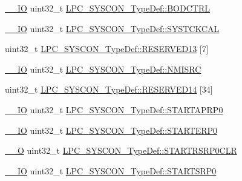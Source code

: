 \begin{DoxyCompactItemize}
\item 
\hyperlink{group___c_m_s_i_s__core__definitions_gaec43007d9998a0a0e01faede4133d6be}{\+\_\+\+\_\+\+IO} uint32\+\_\+t \hyperlink{group___l_p_c11xx___definitions_ga6c18e909c190b4b0819a72c6cc346661}{L\+P\+C\+\_\+\+S\+Y\+S\+C\+O\+N\+\_\+\+Type\+Def\+::\+B\+O\+D\+C\+T\+RL}
\item 
\hyperlink{group___c_m_s_i_s__core__definitions_gaec43007d9998a0a0e01faede4133d6be}{\+\_\+\+\_\+\+IO} uint32\+\_\+t \hyperlink{group___l_p_c11xx___definitions_gaa7900975ba840724314c3994379eb63b}{L\+P\+C\+\_\+\+S\+Y\+S\+C\+O\+N\+\_\+\+Type\+Def\+::\+S\+Y\+S\+T\+C\+K\+C\+AL}
\item 
uint32\+\_\+t \hyperlink{group___l_p_c11xx___definitions_ga6d48056afe2fd1921e2ce8669c3ffab7}{L\+P\+C\+\_\+\+S\+Y\+S\+C\+O\+N\+\_\+\+Type\+Def\+::\+R\+E\+S\+E\+R\+V\+E\+D13} \mbox{[}7\mbox{]}
\item 
\hyperlink{group___c_m_s_i_s__core__definitions_gaec43007d9998a0a0e01faede4133d6be}{\+\_\+\+\_\+\+IO} uint32\+\_\+t \hyperlink{group___l_p_c11xx___definitions_ga5d5f01b7f5f9ebc4067a0599113db0cd}{L\+P\+C\+\_\+\+S\+Y\+S\+C\+O\+N\+\_\+\+Type\+Def\+::\+N\+M\+I\+S\+RC}
\item 
uint32\+\_\+t \hyperlink{group___l_p_c11xx___definitions_ga044755f7a4c5447c75d2266dfe529b19}{L\+P\+C\+\_\+\+S\+Y\+S\+C\+O\+N\+\_\+\+Type\+Def\+::\+R\+E\+S\+E\+R\+V\+E\+D14} \mbox{[}34\mbox{]}
\item 
\hyperlink{group___c_m_s_i_s__core__definitions_gaec43007d9998a0a0e01faede4133d6be}{\+\_\+\+\_\+\+IO} uint32\+\_\+t \hyperlink{group___l_p_c11xx___definitions_ga2c25ccf3a127a6304bbd0cbf6b7b79d9}{L\+P\+C\+\_\+\+S\+Y\+S\+C\+O\+N\+\_\+\+Type\+Def\+::\+S\+T\+A\+R\+T\+A\+P\+R\+P0}
\item 
\hyperlink{group___c_m_s_i_s__core__definitions_gaec43007d9998a0a0e01faede4133d6be}{\+\_\+\+\_\+\+IO} uint32\+\_\+t \hyperlink{group___l_p_c11xx___definitions_ga96a994387b964d63f90460bb4d473c19}{L\+P\+C\+\_\+\+S\+Y\+S\+C\+O\+N\+\_\+\+Type\+Def\+::\+S\+T\+A\+R\+T\+E\+R\+P0}
\item 
\hyperlink{group___c_m_s_i_s__core__definitions_ga7e25d9380f9ef903923964322e71f2f6}{\+\_\+\+\_\+O} uint32\+\_\+t \hyperlink{group___l_p_c11xx___definitions_gaca777f145324363be79ee75267222aa4}{L\+P\+C\+\_\+\+S\+Y\+S\+C\+O\+N\+\_\+\+Type\+Def\+::\+S\+T\+A\+R\+T\+R\+S\+R\+P0\+C\+LR}
\item 
\hyperlink{group___c_m_s_i_s__core__definitions_gaec43007d9998a0a0e01faede4133d6be}{\+\_\+\+\_\+\+IO} uint32\+\_\+t \hyperlink{group___l_p_c11xx___definitions_ga3c4af7c32837d8f9c4f299215c6b656d}{L\+P\+C\+\_\+\+S\+Y\+S\+C\+O\+N\+\_\+\+Type\+Def\+::\+S\+T\+A\+R\+T\+S\+R\+P0}

\end{DoxyCompactItemize}
